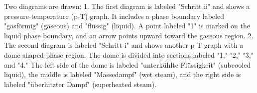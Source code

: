 Two diagrams are drawn:  
1. The first diagram is labeled "Schritt ii" and shows a pressure-temperature (p-T) graph. It includes a phase boundary labeled "gasförmig" (gaseous) and "flüssig" (liquid). A point labeled "1" is marked on the liquid phase boundary, and an arrow points upward toward the gaseous region.  
2. The second diagram is labeled "Schritt i" and shows another p-T graph with a dome-shaped phase region. The dome is divided into sections labeled "1," "2," "3," and "4." The left side of the dome is labeled "unterkühlte Flüssigkeit" (subcooled liquid), the middle is labeled "Massedampf" (wet steam), and the right side is labeled "überhitzter Dampf" (superheated steam).